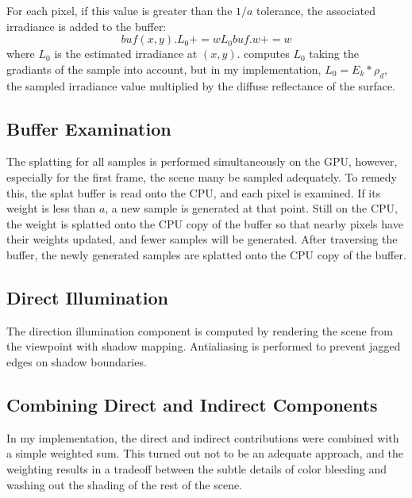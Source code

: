 \documentclass[10pt,twopage]{acmsiggraph}
\begin{document}
For each pixel, if this value is greater than the $1/a$ tolerance, the associated irradiance is added to the buffer: 
$$
buf(x,y).L_0 += wL_0
buf.w += w
$$
where $L_0$ is the estimated irradiance at $(x,y)$.  \cite{mainpaper} computes $L_0$ taking the gradiants of the sample into account, but in my implementation, $L_0 = E_k*\rho_d$, the sampled irradiance value multiplied by the diffuse reflectance of the surface.  

\subsection{Buffer Examination}
The splatting for all samples is performed simultaneously on the GPU, however, especially for the first frame, the scene many be sampled adequately.  To remedy this, the splat buffer is read onto the CPU, and each pixel is examined.  If its weight is less than $a$, a new sample is generated at that point.  Still on the CPU, the weight is splatted onto the CPU copy of the buffer so that nearby pixels have their weights updated, and fewer samples will be generated.  After traversing the buffer, the newly generated samples are splatted onto the CPU copy of the buffer.

\subsection{Direct Illumination}
The direction illumination component is computed by rendering the scene from the viewpoint with shadow mapping.  Antialiasing is performed to prevent jagged edges on shadow boundaries.

\subsection{Combining Direct and Indirect Components}
In my implementation, the direct and indirect contributions were combined with a simple weighted sum.  This turned out not to be an adequate approach, and the weighting results in a tradeoff between the subtle details of color bleeding and washing out the shading of the rest of the scene.


{\small}

%
%


\cleardoublepage
\end{document}

